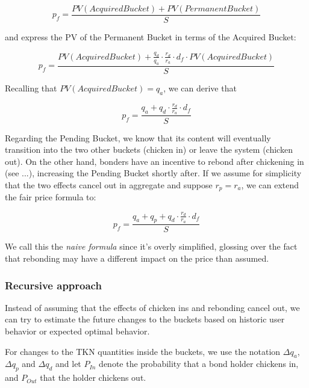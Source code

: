 \documentclass{article}
\begin{document}
\begin{equation}
  \label{eq:naive-1}
    p_f = \frac{PV(AcquiredBucket) + PV(PermanentBucket)}{S}
\end{equation}

and express the PV of the Permanent Bucket in terms of the Acquired Bucket:

\begin{equation}
  \label{eq:naive-2}
   p_f = \frac{PV(AcquiredBucket) + \frac{q_d}{q_a} \cdot \frac{r_d}{r_a} \cdot d_f \cdot PV(AcquiredBucket)}{S}
\end{equation}

Recalling that $PV(AcquiredBucket) = q_a$, we can derive that

\begin{equation}
  \label{eq:naive-3}
   p_f = \frac{q_a + q_d \cdot \frac{r_d}{r_a} \cdot d_f}{S}
\end{equation}

Regarding the Pending Bucket, we know that its content will eventually transition into the two other buckets (chicken in) or leave the system (chicken out). On the other hand, bonders have an incentive to rebond after chickening in (see ...), increasing the Pending Bucket shortly after. If we assume for simplicity that the two effects cancel out in aggregate and suppose $r_p = r_a$, we can extend the fair price formula to:

\begin{equation}
  \label{eq:naive-4}
   p_f = \frac{q_a + q_p + q_d \cdot \frac{r_d}{r_a} \cdot d_f}{S}
\end{equation}

We call this the \textit{naive formula} since it's overly simplified, glossing over the fact that rebonding may have a different impact on the price than assumed. 

\subsubsection{Recursive approach}
Instead of assuming that the effects of chicken ins and rebonding cancel out, we can try to estimate the future changes to the buckets based on historic user behavior or expected optimal behavior.

For changes to the TKN quantities inside the buckets, we use the notation $\Delta q_{a}$, $\Delta q_{p}$ and $\Delta q_{d}$ and let $P_{In}$ denote the probability that a bond holder chickens in, and $P_{Out}$ that the holder chickens out.
\end{document}
